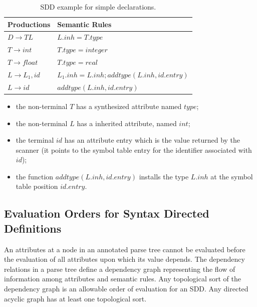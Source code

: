 \begin{table}[h]
	\centering
	\begin{tabular}{l|l}
		Productions & Semantic Rules \\ \hline
		$D \to TL$ & $L.inh = T.type$ \\ \hline
		$T \to int$ & $T.type = integer$ \\ \hline
		$T \to float$ & $T.type = real$ \\ \hline
		$L \to L_1, id$ & $L_1.inh = L.inh; addtype(L.inh, id.entry)$ \\ \hline
		$L \to id$ & $addtype(L.inh, id.entry)$
	\end{tabular}
	\caption{SDD example for simple declarations.}
\end{table}

\begin{itemize}
	\item the non-terminal $T$ has a synthesized attribute named $type$;
	\item the non-terminal $L$ has a inherited attribute, named $int$;
	\item the terminal $id$ has an attribute entry which is the value returned by the scanner (it points to the symbol table entry for the identifier associated with $id$);
	\item the function $addtype(L.inh, id.entry)$ installs the type $L.inh$ at the symbol table position $id.entry$.
\end{itemize}

\subsection{Evaluation Orders for Syntax Directed Definitions}
An attributes at a node in an annotated parse tree cannot be evaluated before the evaluation of all attributes upon which its value depends.
The dependency relations in a parse tree define a dependency graph representing the flow of information among attributes and semantic rules.
Any topological sort of the dependency graph is an allowable order of evaluation for an SDD.
Any directed acyclic graph has at least one topological sort.

